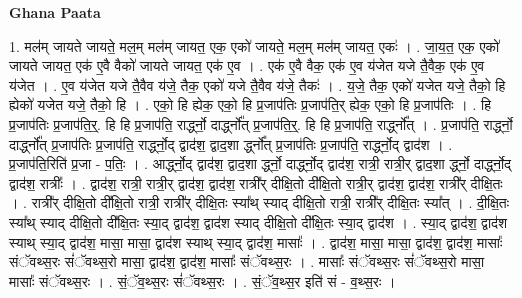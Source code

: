 \documentclass[17pt]{extarticle}
\begin{document}
\textbf{Ghana Paata } \newline

1. मल॑म् जायते जायते॒ मल॒म् मल॑म् जायत॒ एक॒ एको॑ जायते॒ मल॒म् मल॑म् जायत॒ एकः॑ । . जा॒य॒त॒ एक॒ एको॑ जायते जायत॒ एक॑ ए॒वै वैको॑ जायते जायत॒ एक॑ ए॒व । . एक॑ ए॒वै वैक॒ एक॑ ए॒व य॑जेत यजे तै॒वैक॒ एक॑ ए॒व य॑जेत । . ए॒व य॑जेत यजे तै॒वैव य॑जे॒ तैक॒ एको॑ यजे तै॒वैव य॑जे॒ तैकः॑ । . य॒जे॒ तैक॒ एको॑ यजेत यजे॒ तैको॒ हि ह्येको॑ यजेत यजे॒ तैको॒ हि । . एको॒ हि ह्येक॒ एको॒ हि प्र॒जाप॑तिः प्र॒जाप॑ति॒र् ह्येक॒ एको॒ हि प्र॒जाप॑तिः । . हि प्र॒जाप॑तिः प्र॒जाप॑ति॒र्॒. हि हि प्र॒जाप॑ति॒ रार्द्ध्नो॒ दार्द्ध्नो᳚त् प्र॒जाप॑ति॒र्॒. हि हि प्र॒जाप॑ति॒ रार्द्ध्नो᳚त् । . प्र॒जाप॑ति॒ रार्द्ध्नो॒ दार्द्ध्नो᳚त् प्र॒जाप॑तिः प्र॒जाप॑ति॒ रार्द्ध्नो॒द् द्वाद॑श॒ द्वाद॒शा र्द्ध्नो᳚त् प्र॒जाप॑तिः प्र॒जाप॑ति॒ रार्द्ध्नो॒द् द्वाद॑श । . प्र॒जाप॑ति॒रिति॑ प्र॒जा - प॒तिः॒ । . आर्द्ध्नो॒द् द्वाद॑श॒ द्वाद॒शा र्द्ध्नो॒ दार्द्ध्नो॒द् द्वाद॑श॒ रात्री॒ रात्री॒र् द्वाद॒शा र्द्ध्नो॒ दार्द्ध्नो॒द् द्वाद॑श॒ रात्रीः᳚ । . द्वाद॑श॒ रात्री॒ रात्री॒र् द्वाद॑श॒ द्वाद॑श॒ रात्री᳚र् दीक्षि॒तो दी᳚क्षि॒तो रात्री॒र् द्वाद॑श॒ द्वाद॑श॒ रात्री᳚र् दीक्षि॒तः । . रात्री᳚र् दीक्षि॒तो दी᳚क्षि॒तो रात्री॒ रात्री᳚र् दीक्षि॒तः स्या᳚थ् स्याद् दीक्षि॒तो रात्री॒ रात्री᳚र् दीक्षि॒तः स्या᳚त् । . दी॒क्षि॒तः स्या᳚थ् स्याद् दीक्षि॒तो दी᳚क्षि॒तः स्या॒द् द्वाद॑श॒ द्वाद॑श स्याद् दीक्षि॒तो दी᳚क्षि॒तः स्या॒द् द्वाद॑श । . स्या॒द् द्वाद॑श॒ द्वाद॑श स्याथ् स्या॒द् द्वाद॑श॒ मासा॒ मासा॒ द्वाद॑श स्याथ् स्या॒द् द्वाद॑श॒ मासाः᳚ । . द्वाद॑श॒ मासा॒ मासा॒ द्वाद॑श॒ द्वाद॑श॒ मासाः᳚ संॅवथ्स॒रः सं॑ॅवथ्स॒रो मासा॒ द्वाद॑श॒ द्वाद॑श॒ मासाः᳚ संॅवथ्स॒रः । . मासाः᳚ संॅवथ्स॒रः सं॑ॅवथ्स॒रो मासा॒ मासाः᳚ संॅवथ्स॒रः । . सं॒ॅव॒थ्स॒रः सं॑ॅवथ्स॒रः । . सं॒ॅव॒थ्स॒र इति॑ सं - व॒थ्स॒रः । \newline
\end{document}
